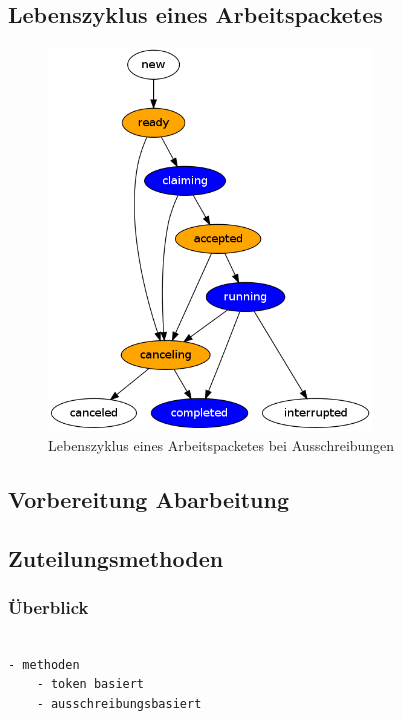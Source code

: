 \subsection{Lebenszyklus eines Arbeitspacketes}


\begin{figure}[ht] 
  \label{fig:lebenszyklus-arbeitspaket}
  \begin{center}
      \includegraphics[height=4in]{imageinput/lebenszyklus-arbeitspaket.png}
  \end{center}
  \caption{Lebenszyklus eines Arbeitspacketes bei Ausschreibungen}
\end{figure}


\subsection{Vorbereitung Abarbeitung}

\subsection{Zuteilungsmethoden}
\subsubsection{\"Uberblick}

\begin{verbatim}

- methoden
    - token basiert
    - ausschreibungsbasiert

\end{verbatim}


